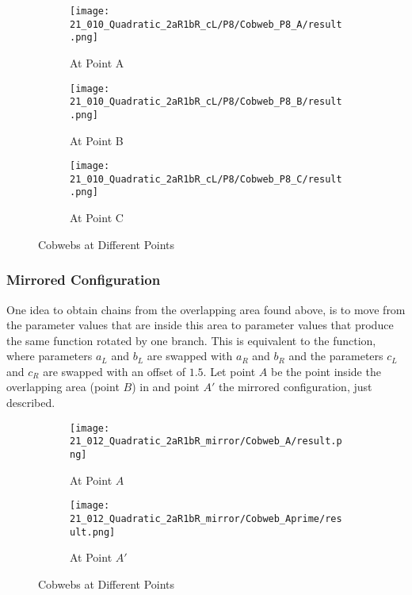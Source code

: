 \begin{figure}
    \centering
    \begin{subfigure}{0.3\textwidth}
        \centering
        \texttt{[image: 21\_010\_Quadratic\_2aR1bR\_cL/P8/Cobweb\_P8\_A/result.png]}
        \caption{At Point A}
        \label{fig:quad.full.2aR1bR_cL.2.CobwebA}
    \end{subfigure}
    \begin{subfigure}{0.3\textwidth}
        \centering
        \texttt{[image: 21\_010\_Quadratic\_2aR1bR\_cL/P8/Cobweb\_P8\_B/result.png]}
        \caption{At Point B}
        \label{fig:quad.full.2aR1bR_cL.2.CobwebB}
    \end{subfigure}
    \begin{subfigure}{0.3\textwidth}
        \centering
        \texttt{[image: 21\_010\_Quadratic\_2aR1bR\_cL/P8/Cobweb\_P8\_C/result.png]}
        \caption{At Point C}
        \label{fig:quad.full.2aR1bR_cL.2.CobwebC}
    \end{subfigure}
    \caption{Cobwebs at Different Points}
    \label{fig:quad.full.2aR1bR_cL.2.Cobwebs}
\end{figure}

\subsubsection{Mirrored Configuration}

One idea to obtain chains from the overlapping area found above, is to move from the parameter values that are inside this area to parameter values that produce the same function rotated by one branch.
This is equivalent to the function, where parameters $a_L$ and $b_L$ are swapped with $a_R$ and $b_R$ and the parameters $c_L$ and $c_R$ are swapped with an offset of $1.5$.
Let point $A$ be the point inside the overlapping area (point $B$) in  and point $A'$ the mirrored configuration, just described.

\begin{figure}
    \centering
    \begin{subfigure}{0.4\textwidth}
        \centering
        \texttt{[image: 21\_012\_Quadratic\_2aR1bR\_mirror/Cobweb\_A/result.png]}
        \caption{At Point $A$}
        \label{fig:quad.full.2aR1bR_cL_mirr.1.CobwebA}
    \end{subfigure}
    \begin{subfigure}{0.4\textwidth}
        \centering
        \texttt{[image: 21\_012\_Quadratic\_2aR1bR\_mirror/Cobweb\_Aprime/result.png]}
        \caption{At Point $A'$}
        \label{fig:quad.full.2aR1bR_cL_mirr.1.CobwebAprime}
    \end{subfigure}
    \caption{Cobwebs at Different Points}
    \label{fig:quad.full.2aR1bR_cL_mirr.1.Cobwebsprime}
\end{figure}

